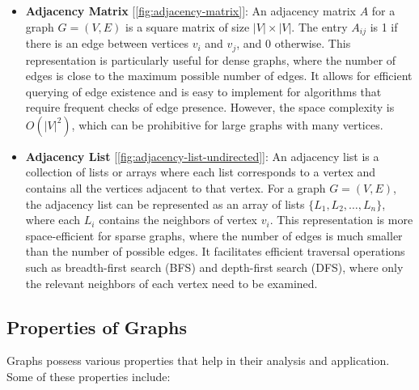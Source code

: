 \documentclass[../Thesis.tex]{subfiles}
\begin{document}
	\begin{itemize}
		\item \textbf{Adjacency Matrix} [\autoref{fig:adjacency-matrix}]: An adjacency matrix \( A \) for a graph \( G = (V, E) \) is a square matrix of size \( |V| \times |V| \). The entry \( A_{ij} \) is 1 if there is an edge between vertices \( v_i \) and \( v_j \), and 0 otherwise. This representation is particularly useful for dense graphs, where the number of edges is close to the maximum possible number of edges. It allows for efficient querying of edge existence and is easy to implement for algorithms that require frequent checks of edge presence. However, the space complexity is \( O(|V|^2) \), which can be prohibitive for large graphs with many vertices.
		
		
		\item \textbf{Adjacency List} [\autoref{fig:adjacency-list-undirected}]: An adjacency list is a collection of lists or arrays where each list corresponds to a vertex and contains all the vertices adjacent to that vertex. For a graph \( G = (V, E) \), the adjacency list can be represented as an array of lists \( \{L_1, L_2, \ldots, L_n\} \), where each \( L_i \) contains the neighbors of vertex \( v_i \). This representation is more space-efficient for sparse graphs, where the number of edges is much smaller than the number of possible edges. It facilitates efficient traversal operations such as breadth-first search (BFS) and depth-first search (DFS), where only the relevant neighbors of each vertex need to be examined.
		
		
	\end{itemize}
	
	\subsection{Properties of Graphs}
	Graphs possess various properties that help in their analysis and application. Some of these properties include:
	
\end{document}
